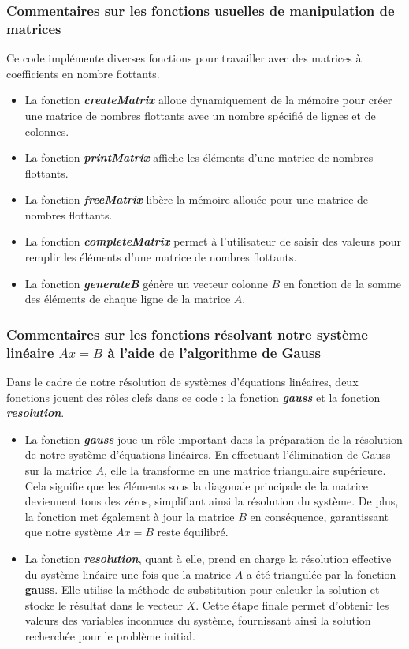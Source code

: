 \documentclass{report}
\begin{document}
\subsubsection{Commentaires sur les fonctions usuelles de manipulation de matrices}\label{fonctusu}
Ce code implémente diverses fonctions pour travailler avec des matrices à coefficients en nombre flottants.\\
\begin{itemize}
\item La fonction \textit{\textbf{createMatrix}} alloue dynamiquement de la mémoire pour créer une matrice de nombres flottants avec un nombre spécifié de lignes et de colonnes.
\item La fonction \textit{\textbf{printMatrix}} affiche les éléments d'une matrice de nombres flottants.
\item La fonction \textit{\textbf{freeMatrix}} libère la mémoire allouée pour une matrice de nombres flottants.
\item La fonction \textit{\textbf{completeMatrix}} permet à l'utilisateur de saisir des valeurs pour remplir les éléments d'une matrice de nombres flottants.
\item La fonction \textit{\textbf{generateB}} génère un vecteur colonne $B$ en fonction de la somme des éléments de chaque ligne de la matrice $A$.
\end{itemize}

\subsubsection{Commentaires sur les fonctions résolvant notre système linéaire $Ax=B$ à l'aide de l'algorithme de Gauss}
Dans le cadre de notre résolution de systèmes d'équations linéaires, deux fonctions jouent des rôles clefs dans ce code : la fonction \textit{\textbf{gauss}} et la fonction \textit{\textbf{resolution}}.\\

\begin{itemize}
\item La fonction \textit{\textbf{gauss}} joue un rôle important dans la préparation de la résolution de notre système d'équations linéaires. En effectuant l'élimination de Gauss sur la matrice $A$, elle la transforme en une matrice triangulaire supérieure. Cela signifie que les éléments sous la diagonale principale de la matrice deviennent tous des zéros, simplifiant ainsi la résolution du système. De plus, la fonction met également à jour la matrice $B$ en conséquence, garantissant que notre système $Ax=B$ reste équilibré.\\

\item La fonction \textit{\textbf{resolution}}, quant à elle, prend en charge la résolution effective du système linéaire une fois que la matrice $A$ a été triangulée par la fonction \textbf{gauss}. Elle utilise la méthode de substitution pour calculer la solution et stocke le résultat dans le vecteur $X$. Cette étape finale permet d'obtenir les valeurs des variables inconnues du système, fournissant ainsi la solution recherchée pour le problème initial.\\
\end{itemize}
\end{document}
